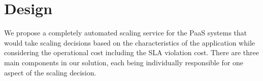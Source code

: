 \section{Design}
We propose a completely automated scaling service for the PaaS systems that would take scaling decisions based on the characteristics of the application while considering the operational cost including the SLA violation cost. There are three main components in our solution, each being individually responsible for one aspect of the scaling decision.\\